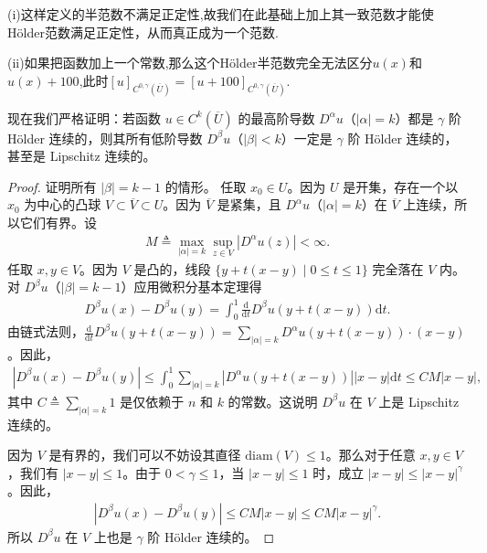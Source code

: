 \documentclass[../../main.tex]{subfiles}
\begin{document}
\begin{remark}
(i)这样定义的半范数不满足正定性,故我们在此基础上加上其一致范数才能使H\"older范数满足正定性，从而真正成为一个范数.

(ii)如果把函数加上一个常数,那么这个H\"older半范数完全无法区分$u(x)$和$u(x)+100$,此时$[u]_{C^{0,\gamma}(\overline{U})}=[u+100]_{C^{0,\gamma}(\overline{U})}$.

现在我们严格证明：若函数 \(u \in C^k(\overline{U})\) 的最高阶导数 \(D^\alpha u\)（\(|\alpha| = k\)）都是 \(\gamma\) 阶 H\"older 连续的，则其所有低阶导数 \(D^\beta u\)（\(|\beta| < k\)）一定是 \(\gamma\) 阶 H\"older 连续的，甚至是 Lipschitz 连续的。
\begin{proof}

证明所有 \(|\beta| = k-1\) 的情形。
任取 \(x_0 \in U\)。因为 \(U\) 是开集，存在一个以 \(x_0\) 为中心的凸球 \(V \subset \overline{V} \subset U\)。因为 \(\overline{V}\) 是紧集，且 \(D^\alpha u\)（\(|\alpha| = k\)）在 \(\overline{V}\) 上连续，所以它们有界。设
\begin{align*}
M \triangleq \max_{|\alpha| = k} \sup_{z \in V} |D^\alpha u(z)| < \infty.
\end{align*}
任取 \(x, y \in V\)。因为 \(V\) 是凸的，线段 \(\{y + t(x - y) \mid 0 \leqslant t \leqslant 1\}\) 完全落在 \(V\) 内。对 \(D^\beta u\)（\(|\beta| = k - 1\)）应用微积分基本定理得
\begin{align*}
D^\beta u(x) - D^\beta u(y) = \int_0^1 \frac{\mathrm{d}}{\mathrm{d}t} D^\beta u(y + t(x - y)) \mathrm{d}t.
\end{align*}
由链式法则，\(\frac{\mathrm{d}}{\mathrm{d}t} D^\beta u(y + t(x - y)) = \sum_{|\alpha| = k} D^\alpha u(y + t(x - y)) \cdot (x - y)\)。因此，
\begin{align*}
|D^\beta u(x) - D^\beta u(y)| \leqslant \int_0^1 \sum_{|\alpha| = k} |D^\alpha u(y + t(x - y))| |x - y| \mathrm{d}t \leqslant C M |x - y|,
\end{align*}
其中 \(C\triangleq \sum_{|\alpha |=k}{1}\) 是仅依赖于 \(n\) 和 \(k\) 的常数。这说明 \(D^\beta u\) 在 \(V\) 上是 Lipschitz 连续的。

因为 \(V\) 是有界的，我们可以不妨设其直径 \(\mathrm{diam}(V) \leqslant 1\)。那么对于任意 \(x, y \in V\)，我们有 \(|x - y| \leqslant 1\)。由于 \(0 < \gamma \leqslant 1\)，当 \(|x - y| \leqslant 1\) 时，成立 \(|x - y| \leqslant |x - y|^\gamma\)。因此，
\begin{align*}
|D^\beta u(x) - D^\beta u(y)| \leqslant C M |x - y| \leqslant C M |x - y|^\gamma.
\end{align*}
所以 \(D^\beta u\) 在 \(V\) 上也是 \(\gamma\) 阶 H\"older 连续的。


\end{proof}
\end{remark}
\end{document}

